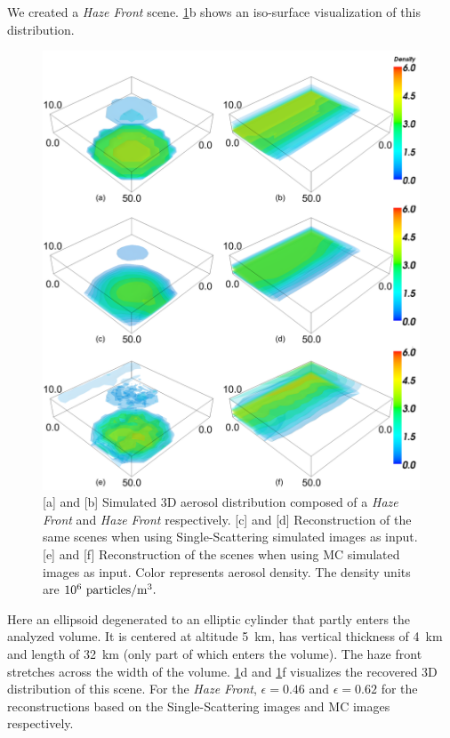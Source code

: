 \documentclass[10pt,letterpaper]{article}
\newcommand{\yoavcomment}[1]{}
\renewcommand{\yoavcomment}[1]{#1} %
\begin{document}
We created a {\em Haze Front} scene. \cref{fig:results}b shows an
iso-surface visualization of this distribution.
\begin{figure}
  \centering
  \yoavcomment{\includegraphics[width=\columnwidth]{images/results}}
  \caption{\small [a] and [b] Simulated 3D aerosol distribution
    composed of a {\em Haze Front} and {\em Haze Front}
    respectively. [c] and [d] Reconstruction of the same scenes when
    using Single-Scattering simulated images as input.  [e] and [f]
    Reconstruction of the scenes when using MC simulated images as
    input.  Color represents aerosol density. The density units are
    $10^{6}~{\rm particles}/{\rm m}^3.$}
  \label{fig:results}
\end{figure}
Here an ellipsoid degenerated to an elliptic cylinder that partly
enters the analyzed volume. It is centered at altitude \SI{5}{\km},
has vertical thickness of \SI{4}{\km} and length of \SI{32}{\km} (only
part of which enters the volume). The haze front stretches across the
width of the volume.  \cref{fig:results}d and \cref{fig:results}f
visualizes the recovered 3D distribution of this scene. For the {\em
  Haze Front}, $\epsilon=0.46$ and $\epsilon=0.62$ for the
reconstructions based on the Single-Scattering images and MC images
respectively.
\end{document}
